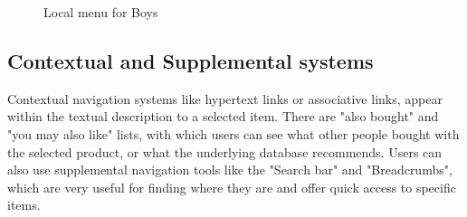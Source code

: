 \begin{figure}[ht!]
  \centering
  \caption{Local menu for Boys}
  \label{fig:localMenu}
\end{figure}

\subsection{Contextual and Supplemental systems}
Contextual navigation systems like hypertext links or associative links, appear within the textual description to a selected item. There are "also bought" and "you may also like" lists, with which users can see what other people bought with the selected product, or what the underlying database recommends. Users can also use supplemental navigation tools like the "Search bar" and "Breadcrumbs", which are very useful for finding where they are and offer quick access to specific items.


